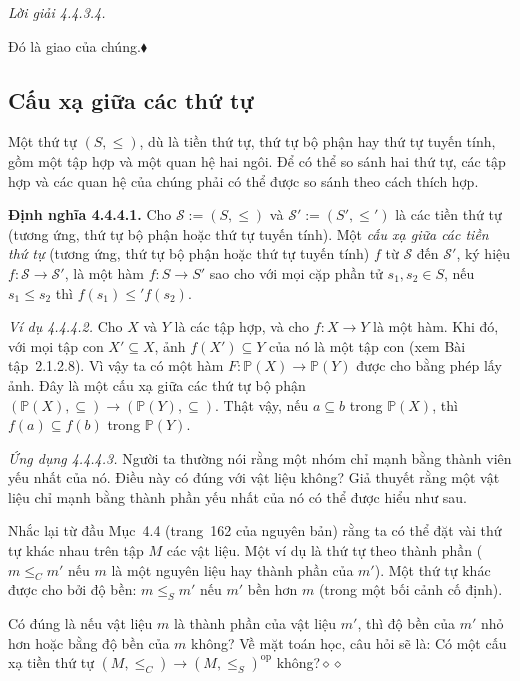\noindent\textit{Lời giải 4.4.3.4.}\keepwithnext

Đó là giao của chúng.\hfill$\blacklozenge$

\subsection{Cấu xạ giữa các thứ tự}

Một thứ tự $(S,\le)$, dù là tiền thứ tự, thứ tự bộ phận hay thứ tự tuyến tính, gồm một tập hợp và một quan hệ hai ngôi. Để có thể so sánh hai thứ tự, các tập hợp và các quan hệ của chúng phải có thể được so sánh theo cách thích hợp.

\noindent\textbf{Định nghĩa 4.4.4.1.} Cho $\mathcal{S}:=(S,\le)$ và $\mathcal{S}':=(S',\le')$ là các tiền thứ tự (tương ứng, thứ tự bộ phận hoặc thứ tự tuyến tính). Một \emph{cấu xạ giữa các tiền thứ tự} (tương ứng, thứ tự bộ phận hoặc thứ tự tuyến tính) $f$ từ $\mathcal{S}$ đến $\mathcal{S}'$, ký hiệu $f:\mathcal{S}\to\mathcal{S}'$, là một hàm $f:S\to S'$ sao cho với mọi cặp phần tử $s_1,s_2\in S$, nếu $s_1\le s_2$ thì $f(s_1)\le'f(s_2)$.

\noindent\textit{Ví dụ 4.4.4.2.} Cho $X$ và $Y$ là các tập hợp, và cho $f:X\to Y$ là một hàm. Khi đó, với mọi tập con $X'\subseteq X$, ảnh $f(X')\subseteq Y$ của nó là một tập con (xem Bài tập~2.1.2.8). Vì vậy ta có một hàm $F:\mathbb{P}(X)\to\mathbb{P}(Y)$ được cho bằng phép lấy ảnh. Đây là một cấu xạ giữa các thứ tự bộ phận $(\mathbb{P}(X),\subseteq)\to(\mathbb{P}(Y),\subseteq)$. Thật vậy, nếu $a\subseteq b$ trong $\mathbb{P}(X)$, thì $f(a)\subseteq f(b)$ trong $\mathbb{P}(Y)$.

\noindent\textit{Ứng dụng 4.4.4.3.} Người ta thường nói rằng một nhóm chỉ mạnh bằng thành viên yếu nhất của nó. Điều này có đúng với vật liệu không? Giả thuyết rằng một vật liệu chỉ mạnh bằng thành phần yếu nhất của nó có thể được hiểu như sau.

Nhắc lại từ đầu Mục~4.4 (trang~162 của nguyên bản) rằng ta có thể đặt vài thứ tự khác nhau trên tập $M$ các vật liệu. Một ví dụ là thứ tự theo thành phần ($m\le_Cm'$ nếu $m$ là một nguyên liệu hay thành phần của $m'$). Một thứ tự khác được cho bởi độ bền: $m\le_Sm'$ nếu $m'$ bền hơn $m$ (trong một bối cảnh cố định).

Có đúng là nếu vật liệu $m$ là thành phần của vật liệu $m'$, thì độ bền của $m'$ nhỏ hơn hoặc bằng độ bền của $m$ không? Về mặt toán học, câu hỏi sẽ là: Có một cấu xạ tiền thứ tự $(M,\le_C)\to(M,\le_S)^{\mathrm{op}}$ không?\nobreak\hfill$\diamond\diamond$

